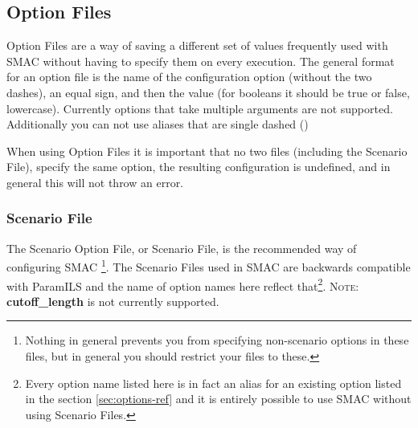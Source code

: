 \documentclass[manual.tex]{subfiles}
\begin{document}
\subsection{Option Files}
Option Files are a way of saving a different set of values 
frequently used with SMAC without having to specify them on every execution. 
The general format for an option file is the name
of the configuration option (without the two dashes), an equal sign, and then the value (for booleans it should be true or false, lowercase). Currently options that take multiple arguments are not supported. Additionally you can not use aliases that are single dashed ()  

When using Option Files it is important that no two files (including the Scenario File), specify the same option, the resulting configuration is undefined, and in general this will not throw an error.

\subsubsection{Scenario File}

The Scenario Option File, or Scenario File, is the recommended way of configuring SMAC \footnote{Nothing in general prevents you from specifying non-scenario options in these files, but in general you should restrict your files to these.}.
The Scenario Files used in SMAC are backwards compatible with ParamILS and the name of option names here reflect that\footnote{Every option name listed here is in fact an alias for an existing option listed in the section \ref{sec:options-ref} and it is entirely possible to use SMAC without using Scenario Files.}. \textsc{Note:} \textbf{cutoff\_length} is not currently supported.
\end{document}
